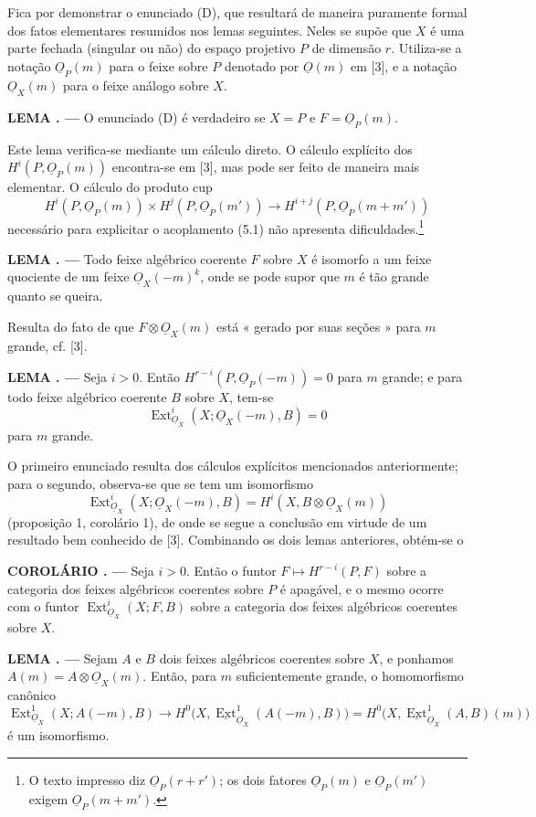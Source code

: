 \documentclass[11pt,twoside,openany]{book}
\numberwithin{equation}{section}
\newcommand{\src}[1]{%
  \phantomsection\hypertarget{src:#1}{}%
  \marginpar{\raggedleft\footnotesize\sffamily #1}%
}
\newcommand{\Osh}{\underline{O}}
\newcommand{\Extsh}{\underline{\operatorname{Ext}}}
\theoremstyle{plain}
\theoremstyle{definition}
\theoremstyle{remark}
\newcommand{\result}[2]{%
  \par\medskip\noindent\textbf{#1%
  \if\relax\detokenize{#2}\relax\else\space#2\fi. ---}\enspace
}
\newcommand{\FgaUnitKey}{frontmatter}
\renewcommand{\src}[1]{%
  \phantomsection\hypertarget{src:\FgaUnitKey:#1}{}%
  \marginpar{\raggedleft\footnotesize\sffamily #1}%
}
\begin{document}
Fica por demonstrar o enunciado (D), que resultará de maneira puramente formal dos fatos
elementares resumidos nos lemas seguintes. Neles se supõe que $X$ é uma
parte fechada (singular ou não) do espaço projetivo $P$ de dimensão $r$.
Utiliza-se a notação $\Osh_P(m)$ para o feixe sobre $P$ denotado por $\Osh(m)$ em
[3], e a notação $\Osh_X(m)$ para o feixe análogo sobre $X$.

\result{LEMA}{2} O enunciado (D) é verdadeiro se $X=P$ e $F=\Osh_P(m)$.

Este lema verifica-se mediante um cálculo direto. O cálculo explícito dos
$H^{i}(P,\Osh_P(m))$ encontra-se em [3], mas pode ser feito de maneira mais
elementar. O cálculo do produto cup
\[
  H^{i}(P,\Osh_P(m))\times H^{j}(P,\Osh_P(m'))
  \longrightarrow H^{i+j}(P,\Osh_P(m+m'))
\]
necessário para explicitar o acoplamento (5.1) não apresenta
dificuldades.\footnote{O texto impresso diz $\Osh_P(r+r')$; os dois fatores
$\Osh_P(m)$ e $\Osh_P(m')$ exigem $\Osh_P(m+m')$.}

\result{LEMA}{3} Todo feixe algébrico coerente $F$ sobre $X$ é isomorfo a
um feixe quociente de um feixe $\Osh_X(-m)^{k}$, onde se pode supor que $m$ é
tão grande quanto se queira.

Resulta do fato de que $F\otimes\Osh_X(m)$ está « gerado por suas seções » para
$m$ grande, cf. [3].

\result{LEMA}{4} Seja $i>0$. Então
$H^{r-i}(P,\Osh_P(-m))=0$ para $m$ grande; e para todo feixe algébrico
coerente $B$ sobre $X$, tem-se
\[
  \operatorname{Ext}_{\Osh_X}^{i}(X;\Osh_X(-m),B)=0
\]
para $m$ grande.

O primeiro enunciado resulta dos cálculos explícitos mencionados anteriormente; para o
segundo, observa-se que se tem um isomorfismo
\[
  \operatorname{Ext}_{\Osh_X}^{i}(X;\Osh_X(-m),B)
  =H^{i}(X,B\otimes\Osh_X(m))
\]
(proposição 1, corolário 1), de onde se segue a conclusão em virtude de um resultado bem
conhecido de [3]. Combinando os dois lemas anteriores, obtém-se o

\result{COROLÁRIO}{} Seja $i>0$. Então o funtor
$F\longmapsto H^{r-i}(P,F)$ sobre a categoria dos feixes algébricos coerentes
sobre $P$ é apagável, e o mesmo ocorre com o funtor
$\operatorname{Ext}_{\Osh_X}^{i}(X;F,B)$ sobre a categoria dos feixes
algébricos coerentes sobre $X$.

\src{184}
\result{LEMA}{5} Sejam $A$ e $B$ dois feixes algébricos coerentes sobre
$X$, e ponhamos $A(m)=A\otimes\Osh_X(m)$. Então, para $m$ suficientemente grande,
o homomorfismo canônico
\[
  \operatorname{Ext}_{\Osh_X}^{1}(X;A(-m),B)
  \longrightarrow H^{0}\bigl(X,\Extsh_{\Osh_X}^{1}(A(-m),B)\bigr)
  =H^{0}\bigl(X,\Extsh_{\Osh_X}^{1}(A,B)(m)\bigr)
\]
é um isomorfismo.
\end{document}
